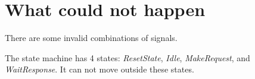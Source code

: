 \section{What could not happen}

There are some invalid combinations of signals.

The state machine has 4 states: \textit{ResetState}, \textit{Idle}, \textit{MakeRequest}, and \textit{WaitResponse}.
It can not move outside these states.
